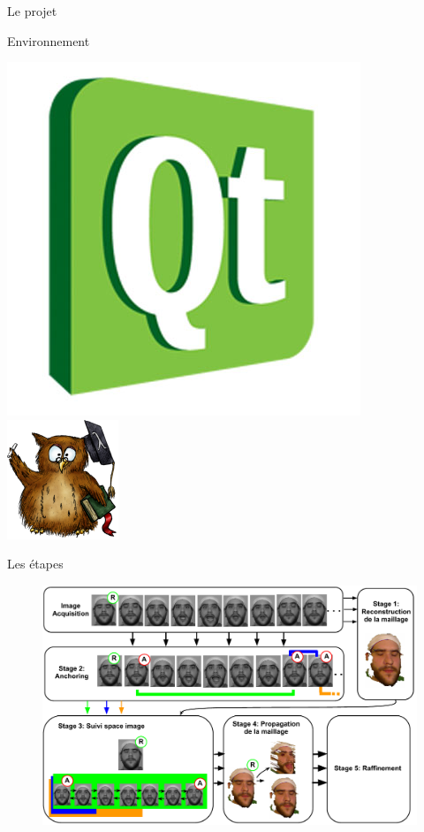 \documentclass[compress,pdf,11pt,xcolor=dvipsnames]{beamer}
\begin{document}
\begin{frame}{Le projet}
\begin{greyblock}{Environnement}
\begin{center}
      \includegraphics[scale=0.1]{img/qt}
      \hspace{3mm}
      \includegraphics[scale=0.3]{img/eigen}
    \end{center}
  \end{greyblock}
    
\end{frame}

\begin{frame}{Les étapes}
\begin{figure}[ht!]
  \begin{center}
    \includegraphics[width=\textwidth]{img/projDiagram}
  \end{center}
\end{figure}
\end{frame}
\end{document}
